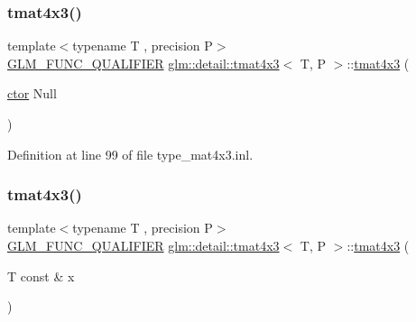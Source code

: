 \mbox{\label{structglm_1_1detail_1_1tmat4x3_abcb7184aeb3a229850057e6bbdb81030}} 
\subsubsection{\texorpdfstring{tmat4x3()}{tmat4x3()}\hspace{0.1cm}{\footnotesize\ttfamily [4/22]}}
{\footnotesize\ttfamily template$<$typename T , precision P$>$ \\
\hyperlink{setup_8hpp_a33fdea6f91c5f834105f7415e2a64407}{G\+L\+M\+\_\+\+F\+U\+N\+C\+\_\+\+Q\+U\+A\+L\+I\+F\+I\+ER} \hyperlink{structglm_1_1detail_1_1tmat4x3}{glm\+::detail\+::tmat4x3}$<$ T, P $>$\+::\hyperlink{structglm_1_1detail_1_1tmat4x3}{tmat4x3} (\begin{DoxyParamCaption}\item[{\hyperlink{structglm_1_1detail_1_1tmat4x3_ac17f13b8e4946fda04e2c86b280491fe}{ctor}}]{Null }\end{DoxyParamCaption})\hspace{0.3cm}{\ttfamily [explicit]}}



Definition at line 99 of file type\+\_\+mat4x3.\+inl.

\mbox{\label{structglm_1_1detail_1_1tmat4x3_a2d1e973fa0706ef8e0fffa4ee23712ab}} 
\subsubsection{\texorpdfstring{tmat4x3()}{tmat4x3()}\hspace{0.1cm}{\footnotesize\ttfamily [5/22]}}
{\footnotesize\ttfamily template$<$typename T , precision P$>$ \\
\hyperlink{setup_8hpp_a33fdea6f91c5f834105f7415e2a64407}{G\+L\+M\+\_\+\+F\+U\+N\+C\+\_\+\+Q\+U\+A\+L\+I\+F\+I\+ER} \hyperlink{structglm_1_1detail_1_1tmat4x3}{glm\+::detail\+::tmat4x3}$<$ T, P $>$\+::\hyperlink{structglm_1_1detail_1_1tmat4x3}{tmat4x3} (\begin{DoxyParamCaption}\item[{T const \&}]{x }\end{DoxyParamCaption})\hspace{0.3cm}{\ttfamily [explicit]}}



